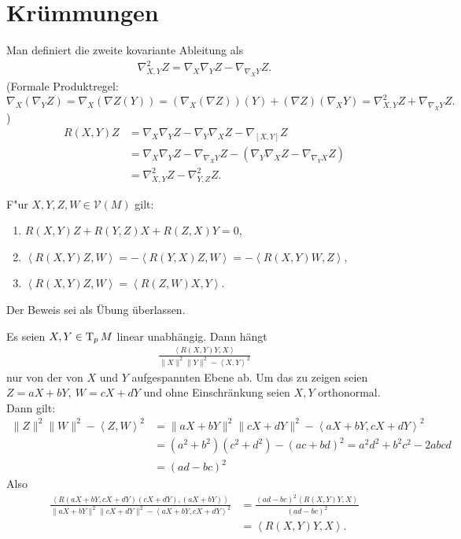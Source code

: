 \section{Krümmungen}

Man definiert die zweite kovariante Ableitung als
\begin{align*}
  \nabla_{X,Y}^2Z = \nabla_X\nabla_YZ - \nabla_{\nabla_XY}Z.
\end{align*}
(Formale Produktregel: $\nabla_X(\nabla_YZ) = \nabla_X(\nabla Z(Y)) = (\nabla_X(\nabla Z))(Y) + (\nabla Z)(\nabla_XY) = \nabla_{X,Y}^2Z + \nabla_{\nabla_XY}Z.$)
\begin{align*}
  R(X,Y)Z & = \nabla_X\nabla_YZ - \nabla_Y\nabla_XZ - \nabla_{[X,Y]}Z\\
& = \nabla_X\nabla_YZ - \nabla_{\nabla_XY}Z - (\nabla_Y\nabla_XZ - \nabla_{\nabla_YX}Z)\\
& = \nabla_{X,Y}^2Z - \nabla_{Y,Z}^2Z.
\end{align*}

\begin{Prop}
F"ur $X,Y,Z,W \in \mathcal V(M)$ gilt:
\begin{enumerate}[label=(\roman*)]
\item
	$R(X,Y)Z + R(Y,Z)X + R(Z,X)Y = 0$,
\item
	$\left<R(X,Y)Z,W\right> = -\left<R(Y,X)Z,W\right> = - \left<R(X,Y)W,Z\right>$,
\item
	$\left<R(X,Y)Z,W\right> = \left<R(Z,W)X,Y\right>$.
\end{enumerate}\end{Prop}

Der Beweis sei als Übung überlassen.

Es seien $X,Y \in \operatorname{T}_pM$ linear unabhängig. Dann hängt
\begin{align*}
  \frac{\left<R(X,Y)Y,X\right>}{\|X\|^2\|Y\|^2 - \left<X,Y\right>^2}
\end{align*}
nur von der von $X$ und $Y$ aufgespannten Ebene ab. Um das zu zeigen seien $Z = aX + bY, \ W = cX + dY$ und ohne Einschränkung seien $X,Y$ orthonormal.
Dann gilt:
\begin{align*}
  \|Z\|^2\|W\|^2 - \left<Z,W\right>^2 & = \|aX + bY\|^2\|cX + dY\|^2 - \left<aX + bY, cX + dY\right>^2\\
& = (a^2 + b^2)(c^2 + d^2) - (ac + bd)^2 = a^2d^2 + b^2c^2 - 2abcd\\
& = (ad - bc)^2
\end{align*}
Also
\begin{align*}
  \frac{\left<R(aX+bY,cX+dY)(cX+dY),(aX+bY)\right>}{\|aX+bY\|^2\|cX+dY\|^2 - \left<aX+bY, cX+dY\right>^2} & = \frac{(ad-bc)^2\left<R(X,Y)Y,X\right>}{(ad-bc)^2}\\
& = \left<R(X,Y)Y,X\right>.
\end{align*}

